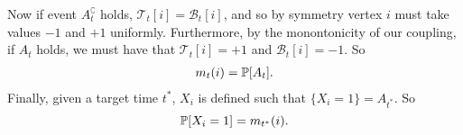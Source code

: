 Now if event $A_t^\complement$ holds, $\mathcal{T}_t[i] = \mathcal{B}_t[i]$, and so by symmetry vertex $i$ must take values $-1$ and $+1$ uniformly. Furthermore, by the monontonicity of our coupling, if $A_t$ holds, we must have that $\mathcal{T}_t[i] = +1$ and $\mathcal{B}_t[i] = -1$.
So
\begin{align}
	m_t(i) = \mathbb{P}[A_t].
\end{align}
Finally, given a target time $t^*$, $X_i$ is defined such that $\{X_i = 1\} = A_{t^*}$. So 
\begin{equation}
	\label{eq:prob X_i = 1 is m_t*}
	\mathbb{P}[X_i = 1] = m_{t^*}(i).	
\end{equation}



